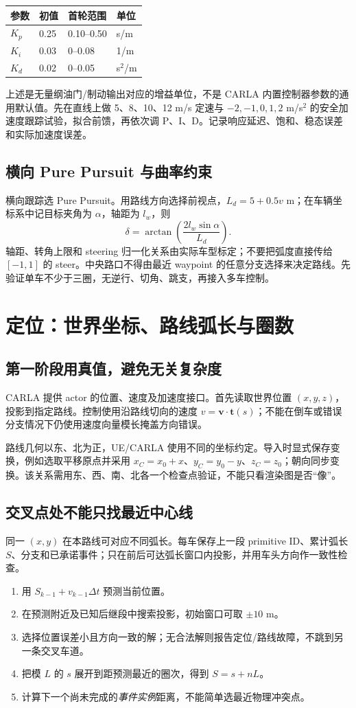 \documentclass[UTF8,fontset=fandol,11pt,a4paper]{ctexart}
\newcommand{\page}[1]{\clearpage\section{#1}}
\begin{document}
\begin{center}\small
\begin{tabular}{llll}\toprule
参数 & 初值 & 首轮范围 & 单位\\\midrule
$K_p$ & 0.25 & 0.10--0.50 & s/m\\
$K_i$ & 0.03 & 0--0.08 & 1/m\\
$K_d$ & 0.02 & 0--0.05 & s$^2$/m\\\bottomrule
\end{tabular}\end{center}
上述是无量纲油门/制动输出对应的增益单位，不是 CARLA 内置控制器参数的通用默认值。先在直线上做 5、8、10、12 m/s 定速与 $-2,-1,0,1,2$ m/s$^2$ 的安全加速度跟踪试验，拟合前馈，再依次调 P、I、D。记录响应延迟、饱和、稳态误差和实际加速度误差。

\subsection{横向 Pure Pursuit 与曲率约束}
横向跟踪选 Pure Pursuit\cite{coulter}。用路线方向选择前视点，$L_d=5+0.5v$ m；在车辆坐标系中记目标夹角为 $\alpha$，轴距为 $l_w$，则
\[
\delta=\arctan\!\left(\frac{2l_w\sin\alpha}{L_d}\right).
\]
轴距、转角上限和 steering 归一化关系由实际车型标定；不要把弧度直接传给 $[-1,1]$ 的 steer。中央路口不得由最近 waypoint 的任意分支选择来决定路线。先验证单车不少于三圈，无逆行、切角、跳支，再接入多车控制。

\page{定位：世界坐标、路线弧长与圈数}
\subsection{第一阶段用真值，避免无关复杂度}
CARLA 提供 actor 的位置、速度及加速度接口\cite{carla_api}。首先读取世界位置 $(x,y,z)$，投影到指定路线。控制使用沿路线切向的速度 $v=\mathbf v\cdot\mathbf t(s)$；不能在倒车或错误分支情况下仍使用速度向量模长掩盖方向错误。

路线几何以东、北为正，UE/CARLA 使用不同的坐标约定。导入时显式保存变换，例如选取平移原点并采用 $x_C=x_0+x$、$y_C=y_0-y$、$z_C=z_0$；朝向同步变换。该关系需用东、西、南、北各一个检查点验证，不能只看渲染图是否“像”。

\subsection{交叉点处不能只找最近中心线}
同一 $(x,y)$ 在本路线可对应不同弧长。每车保存上一段 primitive ID、累计弧长 $S$、分支和已承诺事件；只在前后可达弧长窗口内投影，并用车头方向作一致性检查。
\begin{enumerate}
\item 用 $S_{k-1}+v_{k-1}\Delta t$ 预测当前位置。
\item 在预测附近及已知后继段中搜索投影，初始窗口可取 $\pm10$ m。
\item 选择位置误差小且方向一致的解；无合法解则报告定位/路线故障，不跳到另一条交叉车道。
\item 把模 $L$ 的 $s$ 展开到距预测最近的圈次，得到 $S=s+nL$。
\item 计算下一个尚未完成的\emph{事件实例}距离，不能简单选最近物理冲突点。
\end{enumerate}
\end{document}
